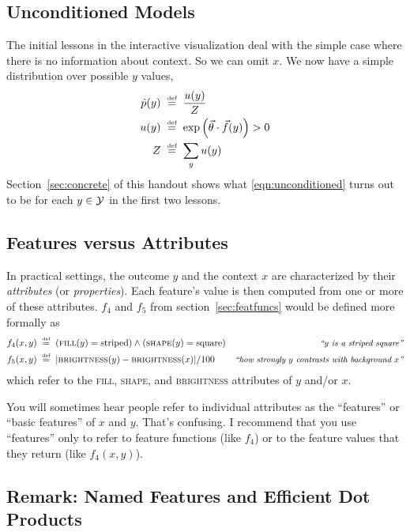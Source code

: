 \documentclass[11pt]{article}
\newcommand{\defeq}{\;\stackrel{\mbox{\tiny def}}{=}\;}
\newcommand{\vtheta}{\vec{\theta}}
\newcommand{\ph}{\hat{p}}
\begin{document}
\subsection{Unconditioned Models}\label{sec:unconditioned}

The initial lessons in the interactive visualization deal with the
simple case where there is no information about context.  So we can
omit $x$.  We now have a simple distribution over possible $y$ values,
\begin{align}
  \ph(y) &\defeq \frac{u(y)}{Z} \label{eqn:unconditioned} \\
  u(y) &\defeq \exp \left(\vtheta \cdot \vec{f}(y)\right) > 0 \\
  Z &\defeq \sum_y u(y)
\end{align}
Section~\ref{sec:concrete} of this handout shows what \eqref{eqn:unconditioned}
turns out to be for each $y \in {\cal Y}$ in the first two lessons.

\subsection{Features versus Attributes}

In practical settings, the outcome $y$ and the context $x$ are
characterized by their {\em attributes} (or {\em properties}).  Each
feature's value is then computed from one or more of these attributes.
$f_4$ and $f_5$ from section~\ref{sec:featfuncs} would be defined more
formally as
\begin{align}
f_4(x,y) & \defeq (\textsc{fill}(y)=\text{striped}) \wedge (\textsc{shape}(y)=\text{square})
             & \text{\small\it ``$y$ is a striped square''} \\
f_5(x,y) & \defeq |\textsc{brightness}(y)-\textsc{brightness}(x)|/100
             & \text{\small\it ``how strongly $y$ contrasts with background $x$''}
\end{align}
which refer to the \textsc{fill}, \textsc{shape}, and \textsc{brightness} attributes
of $y$ and/or $x$. 

You will sometimes hear people refer to individual attributes as the
``features'' or ``basic features'' of $x$ and $y$.  That's confusing.
I recommend that you use ``features'' only to refer to feature
functions (like $f_4$) or to the feature values that they return (like $f_4(x,y)$).

\subsection{Remark: Named Features and Efficient Dot Products}
\end{document}
